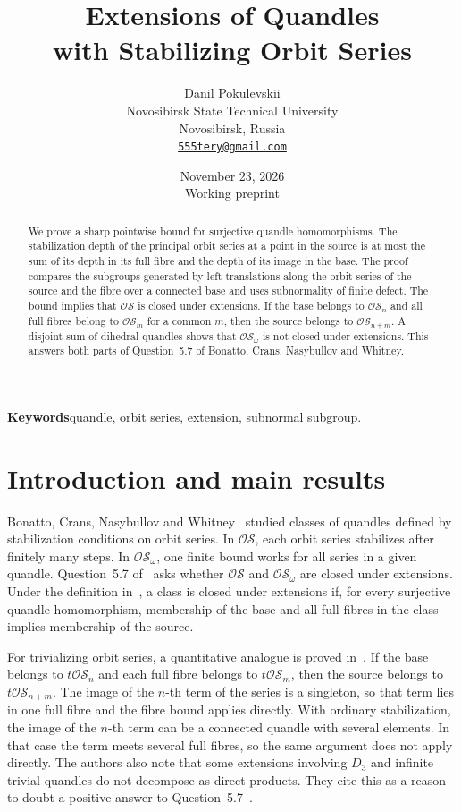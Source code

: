 \documentclass[11pt,a4paper]{article}
\title{Extensions of Quandles\\with Stabilizing Orbit Series}
\author{Danil Pokulevskii\\[3pt]
  \small Novosibirsk State Technical University\\
  \small Novosibirsk, Russia\\
  \small\href{mailto:555tery@gmail.com}{\texttt{555tery@gmail.com}}}
\date{November 23, 2026\\[2pt]\small Working preprint}
\theoremstyle{remark}
\newcommand{\OS}{\mathcal{OS}}
\newcommand{\tOS}{t\mathcal{OS}}
\begin{document}
\maketitle

\begin{abstract}
We prove a sharp pointwise bound for surjective quandle homomorphisms.
The stabilization depth of the principal orbit series at a point in the
source is at most the sum of its depth in its full fibre and the depth of
its image in the base. The proof compares the subgroups generated by left
translations along the orbit series of the source and the fibre over a
connected base and uses subnormality of finite defect. The bound implies
that \(\OS\) is closed under extensions. If the base belongs to \(\OS_n\)
and all full fibres belong to \(\OS_m\) for a common \(m\), then the
source belongs to \(\OS_{n+m}\). A disjoint sum of dihedral quandles
shows that \(\OS_\omega\) is not closed under extensions. This answers
both parts of Question~5.7 of Bonatto, Crans, Nasybullov and Whitney.
\end{abstract}

\noindent\textbf{Keywords}\quad quandle, orbit series, extension,
subnormal subgroup.

\section{Introduction and main results}

Bonatto, Crans, Nasybullov and Whitney~\cite[Section~4.1]{BCNW} studied
classes of quandles defined by stabilization conditions on orbit series.
In \(\OS\), each orbit series stabilizes after finitely many steps.
In \(\OS_\omega\), one finite bound works for all series in a given
quandle. Question~5.7 of~\cite[p.~301]{BCNW} asks whether \(\OS\) and
\(\OS_\omega\) are closed under extensions. Under the definition
in~\cite[Section~2.2]{BCNW}, a class is closed under extensions if, for
every surjective quandle homomorphism, membership of the base and all
full fibres in the class implies membership of the source.

For trivializing orbit series, a quantitative analogue is proved
in~\cite[Lemma~5.5]{BCNW}. If the base belongs to \(\tOS_n\) and each
full fibre belongs to \(\tOS_m\), then the source belongs to
\(\tOS_{n+m}\). The image of the \(n\)-th term of the series is a
singleton, so that term lies in one full fibre and the fibre bound
applies directly. With ordinary stabilization, the image of the
\(n\)-th term can be a connected quandle with several elements. In that
case the term meets several full fibres, so the same argument does not
apply directly. The authors also note that some extensions involving
\(D_3\) and infinite trivial quandles do not decompose as direct
products. They cite this as a reason to doubt a positive answer to
Question~5.7~\cite[p.~302]{BCNW}.
\end{document}
